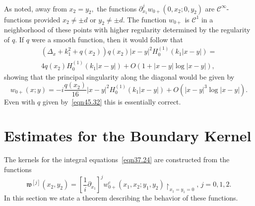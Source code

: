 \documentclass[11pt]{article}
\newcommand\fw{\mathfrak w}
\newcommand\cC{\mathcal{C}}
\newcommand\pa{\partial}
\newcommand\restrictedto{\upharpoonright}
\theoremstyle{definition}
\theoremstyle{remark}
\begin{document}
As noted, away from $x_2=y_2,$ the functions $\pa_{x_1}^jw_{0+}(0,x_2;0,y_2)$
are $\cC^{\infty}$-functions provided $x_2\neq \pm d$ or $y_2\neq \pm d.$ The
function $w_{0+}$  is  $\cC^1$ in a neighborhood of these points with higher
regularity determined by the regularity of $q.$ If $q$ were a smooth
function, then it would follow that
\begin{multline}\label{eqn87.24}
  (\Delta_x+k_1^2+q(x_2))q(x_2)|x-y|^2H^{(1)}_0(k_1|x-y|)=
  \\4 q(x_2)H^{(1)}_0(k_1|x-y|)+O(1+|x-y|\log|x-y|),
\end{multline}
showing that the principal singularity along the diagonal would be given by
\begin{equation}
  w_{0+}(x;y)=-i\frac{q(x_2)}{16}|x-y|^2H^{(1)}_0(k_1|x-y|)+O(|x-y|^3\log|x-y|).
\end{equation}
Even with $q$ given by~\eqref{eqn45.32} this is essentially correct.


\section{Estimates for the Boundary Kernel}\label{sec6}


 The kernels for the integral equations~\eqref{eqn37.24} are constructed from the functions
\begin{equation}\label{eqn87.23}
  \fw^{[j]}(x_2,y_2)=\left[\frac{1}{i}\pa_{x_1}\right]^jw^c_{0+}(x_1,x_2;y_1,y_2)
  \restrictedto_{x_1=y_1=0},\,
  j=0,1,2.
\end{equation}
In this section we state a theorem describing the behavior of these functions.
\end{document}
